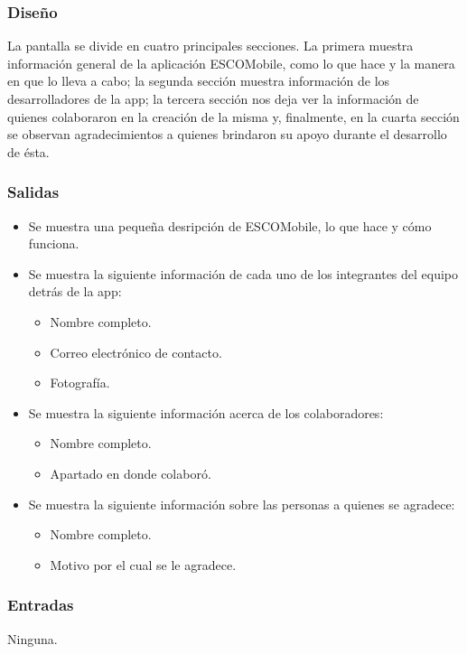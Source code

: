 \subsubsection{Diseño}
	\noindent
	La pantalla se divide en cuatro principales secciones. La primera muestra información general
	de la aplicación ESCOMobile, como lo que hace y la manera en que lo lleva a cabo; la segunda
	sección muestra información de los desarrolladores de la app; la tercera sección nos deja
	ver la información de quienes colaboraron en la creación de la misma y, finalmente, en la cuarta
	sección se observan agradecimientos a quienes brindaron su apoyo durante el desarrollo de ésta.

\pagebreak
{}

\subsubsection{Salidas}
	\begin{itemize}
		\item Se muestra una pequeña desripción de ESCOMobile, lo que hace y cómo funciona. 
		\item Se muestra la siguiente información de cada uno de los integrantes del equipo detrás de la app: 
			\begin{itemize}
				\item Nombre completo. 
				\item Correo electrónico de contacto.
				\item Fotografía.
			\end{itemize}
		\item Se muestra la siguiente información acerca de los colaboradores: 
			\begin{itemize}
				\item Nombre completo. 
				\item Apartado en donde colaboró.
			\end{itemize}
		\item Se muestra la siguiente información sobre las personas a quienes se agradece: 
			\begin{itemize}
				\item Nombre completo. 
				\item Motivo por el cual se le agradece.
			\end{itemize}
	\end{itemize}

\subsubsection{Entradas}
	\noindent
	Ninguna.

